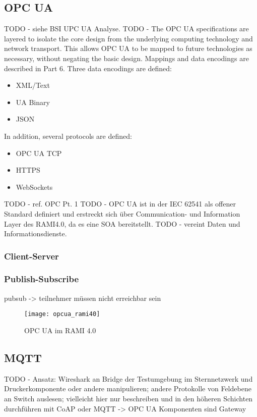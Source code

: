 \subsection{\ac{OPC UA}}
\label{Analyse:OPCUA}
TODO - siehe BSI UPC UA Analyse.
TODO - The OPC UA specifications are layered to isolate the core design from the underlying computing technology and network transport. This allows OPC UA to be mapped to future technologies as necessary, without negating the basic design. Mappings and data encodings are described in Part 6. Three data encodings are defined:
\begin{itemize}
    \item XML/Text
    \item UA Binary
    \item JSON
\end{itemize}
In addition, several protocols are defined:
\begin{itemize}
    \item OPC UA TCP
    \item HTTPS
    \item WebSockets
\end{itemize}

TODO - ref. OPC Pt. 1
TODO - \ac{OPC UA} ist in der \ac{IEC} 62541 als offener Standard definiert und erstreckt sich über Communication- und Information Layer des \ac{RAMI4.0}, da es eine \ac{SOA} bereitstellt. 
TODO - vereint Daten und Informationsdienste. 

\subsubsection{Client-Server}
\subsubsection{Publish-Subscribe}
pubsub -> teilnehmer müssen nicht erreichbar sein

\begin{figure}[h]
    \centering
    \texttt{[image: opcua\_rami40]}
    \caption{OPC UA im RAMI 4.0}
    \label{Kap3:OPC UA im RAMI 4.0}
  \end{figure}
\clearpage

\subsection{\ac{MQTT}}
TODO - Ansatz: Wireshark an Bridge der Testumgebung im Sternnetzwerk und Druckerkomponente oder andere manipulieren; andere Protokolle von Feldebene an Switch auslesen; vielleicht hier nur beschreiben und in den höheren Schichten durchführen mit CoAP oder MQTT -> OPC UA Komponenten sind Gateway

